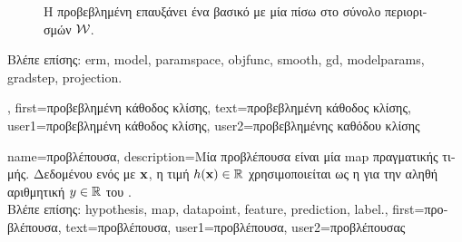 {{\begin{figure}[H]
\begin{center}
		\end{center}
		{
		\caption{\foreignlanguage{greek}{Η προβεβλημένη}  \foreignlanguage{greek}{επαυξάνει ένα βασικό} 
			 \foreignlanguage{greek}{με μία}  \foreignlanguage{greek}{πίσω στο σύνολο 
			περιορισμών} $\mathcal{W}$.}
		\label{fig_projected_GD_dict} }
		\end{figure}
		\foreignlanguage{greek}{Βλέπε επίσης:} \gls{erm}, \gls{model}, \gls{paramspace}, \gls{objfunc}, \gls{smooth}, \gls{gd}, \gls{modelparams}, 
		\gls{gradstep}, \gls{projection}.},
	first={\foreignlanguage{greek}{προβεβλημένη κάθοδος κλίσης}},
	text={\foreignlanguage{greek}{προβεβλημένη κάθοδος κλίσης}},
	user1={\foreignlanguage{greek}{προβεβλημένη κάθοδος κλίσης}}, %
	user2={\foreignlanguage{greek}{προβεβλημένης καθόδου κλίσης}} %
}

{name={\foreignlanguage{greek}{προβλέπουσα}},
	description={\foreignlanguage{greek}{Μία προβλέπουσα είναι μία} \gls{map}  
		\foreignlanguage{greek}{πραγματικής τιμής. Δεδομένου ενός}  \foreignlanguage{greek}{με}  
		${\bf x}$, \foreignlanguage{greek}{η τιμή $h({\bf x}) \in \mathbb{R}$ χρησιμοποιείται ως η}  
		\foreignlanguage{greek}{για την αληθή αριθμητική}  $y \in \mathbb{R}$ \foreignlanguage{greek}{του} .\\
		\foreignlanguage{greek}{Βλέπε επίσης:} \gls{hypothesis}, \gls{map}, \gls{datapoint}, \gls{feature}, \gls{prediction}, \gls{label}.},
	first={\foreignlanguage{greek}{προβλέπουσα}},
	text={\foreignlanguage{greek}{προβλέπουσα}},
	user1={\foreignlanguage{greek}{προβλέπουσα}}, %
  	user2={\foreignlanguage{greek}{προβλέπουσας}} %
}

